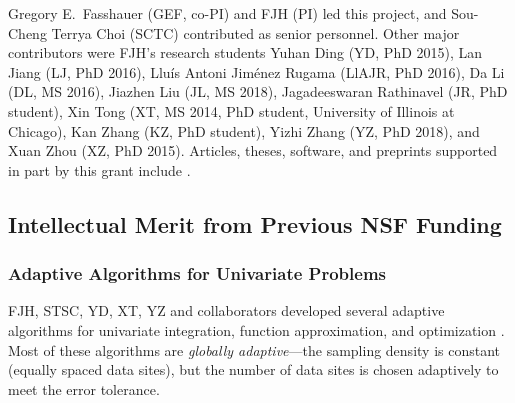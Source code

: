 \documentclass[11pt]{NSFamsart}
\begin{document}
Gregory E.\ Fasshauer (GEF, co-PI) and FJH (PI) led this project, and Sou-Cheng Terrya Choi (SCTC) contributed as senior personnel.  Other major contributors were FJH's research students Yuhan Ding (YD, PhD 2015), Lan Jiang (LJ, PhD 2016), 
Llu\'is Antoni Jim\'enez Rugama (LlAJR, PhD 2016), Da Li (DL, MS 2016), Jiazhen Liu (JL, MS 2018), Jagadeeswaran Rathinavel (JR, 
PhD student), Xin Tong (XT, MS 2014, PhD student, University of Illinois at Chicago), Kan Zhang (KZ, PhD student), Yizhi Zhang (YZ, PhD 2018), and Xuan Zhou (XZ, PhD 2015).  Articles, theses,  
software, and preprints supported in 
part by this 
grant 
include 
\cite{ala_augmented_2017, 
	ChoEtal17a,
	ChoEtal17b,
	Din15a, 
	DinHic20a,
	GilEtal16a,
	Hic17a,
	HicJag18b,
	HicJim16a,
	HicEtal18a,
	HicEtal17a,
	HicKriWoz19a,
	RatHic19a,
	GilJim16b,
	JimHic16a,
	JohFasHic18a,
	Li16a,
	Liu17a,
	MarEtal18a,
	mccourt_stable_2017,
	MCCEtal19a,
	mishra_hybrid_2018,
	MisEtal19a,
	rashidinia_stable_2016,
	rashidinia_stable_2018,
	Zha18a,
	Zha17a,
	Zho15a,
	ZhoHic15a}.

\subsection{Intellectual Merit from Previous NSF Funding}
\label{previousmeritsubsec}

\subsubsection{Adaptive Algorithms for Univariate Problems} \label{sec:localadpat}
FJH, STSC, YD, XT, YZ and collaborators developed several adaptive algorithms for univariate integration, function approximation, and optimization \cite{ChoEtal17a,HicEtal14b,  Din15a, Ton14a, Zha18a}.  Most of these algorithms are \emph{globally adaptive}---the sampling density is constant (equally spaced data sites), but the number of data sites is chosen adaptively to meet the error tolerance.
\end{document}

